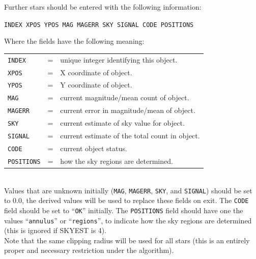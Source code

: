 \documentclass[twoside,11pt,nolof]{starlink}
\providecommand{\ft}[1]{``\texttt{#1}''}
\begin{document}
{{{      Further stars should be entered with the following information:
        \begin{description}
           \item  \texttt{INDEX XPOS YPOS MAG MAGERR SKY SIGNAL CODE POSITIONS }
        \end{description}
       Where the fields have the following meaning:\\
        \begin{tabular}{lll}
           \texttt{INDEX} & = & unique integer identifying this object.\\
           \texttt{XPOS} & = & X coordinate of object.\\
           \texttt{YPOS} & = & Y coordinate of object.\\
           \texttt{MAG} & = & current magnitude/mean count of object.\\
           \texttt{MAGERR} & = & current error in magnitude/mean of object.\\
           \texttt{SKY} & = & current estimate of sky value for object.\\
           \texttt{SIGNAL} & = & current estimate of the total count in object.\\
           \texttt{CODE} & = & current object status.\\
           \texttt{POSITIONS} & = & how the sky regions are determined.\\
         \end{tabular}\\
      Values that are unknown initially (\texttt{MAG}, \texttt{MAGERR}, \texttt{SKY}, and \texttt{SIGNAL})
      should be set to 0.0, the derived values will be used to replace
      these fields on exit. The \texttt{CODE} field should be set to \ft{OK}
      initially. The \texttt{POSITIONS} field should have one the values
      \ft{annulus} or \ft{regions}, to indicate how the sky regions are
      determined (this is ignored if SKYEST is 4). \\

      Note that the same clipping radius will be used for all stars (this
      is an entirely proper and necessary restriction under the algorithm).\\

}}}
\end{document}
